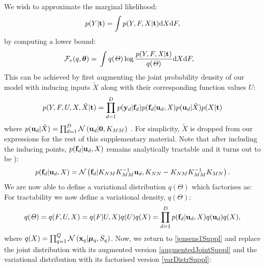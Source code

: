 \documentclass{article} %
\begin{document}
We wish to approximate the marginal likelihood:
\begin{equation}
\label{marginalLikelihoodSuppl}
p(Y | \mathbf{t}) =  \int p( Y , F, X| \mathbf{t}) \text{d}  X \text{d} F,
\end{equation}
by computing a lower bound:
\begin{align}
\mathcal{F}_v(q, \boldsymbol \theta) = {}& \int q(\mathit{\Theta}) \log 
		\frac{ p(Y , F , \mathit{X} | \mathbf{t})}
			 {q(\mathit{\Theta})}  \text{d}  X \text{d} F,
		 \label{jensens1Suppl}
\end{align}
%
This can be achieved by first augmenting the joint probability density of our model with inducing inputs $\tilde{X}$ along with their corresponding function values $U$:
\begin{equation}
 \label{augmentedJointSuppl}
p(Y,F, U,X,\tilde{X} | \mathbf{t}) = \prod_{d=1}^D p(\mathbf{y}_d | \mathbf{f}_d) p(\mathbf{f}_d | \mathbf{u}_d, \mathit{X})
p(\mathbf{u}_d | \tilde{X})  p(X | \mathbf{t})
\end{equation}
where $p(\mathbf{u}_d | \tilde{X}) = \prod_{d=1}^D \mathcal{N} \left( \mathbf{u}_d | \mathbf{0}, K_{MM} \right)$ . For simplicity, $\tilde{X}$ is dropped from our
expressions for the rest of this supplementary material. Note that after including the inducing points, $p(\mathbf{f}_d | \mathbf{u}_d, X)$
remains analytically tractable and it turns out to be \cite{rasmussen-williams}):
\begin{equation}
 \label{priorF2Suppl}
p(\mathbf{f}_d | \mathbf{u}_d, X) =  \mathcal{N}  \left( \mathbf{f}_d | K_{NM} K_{MM}^{-1} \mathbf{u}_d , K_{NN} - K_{NM} K_{MM}^{-1} K_{MN} \right).
\end{equation}
We are now able to define a variational distribution $q(\Theta)$ which factorises as:
For tractability we now define a variational density, $q(\Theta)$:
\begin{equation}
\label{varDistrSuppl}
q(\mathit{\Theta}) = q(F, U,X) = q(F | U, X) q(U) q(X) = \prod_{d=1}^D p(\mathbf{f}_d | \mathbf{u}_d, X )q(\mathbf{u}_d) q(X),
\end{equation}
%
%
where $q(X) = \prod_{q=1}^Q \mathcal{N} \left( \mathbf{x}_q | \boldsymbol \mu_q, S_q \right)$. 
%
Now, we return to \eqref{jensens1Suppl} and replace the joint distribution with its augmented version \eqref{augmentedJointSuppl} and the variational distribution with its factorised version \eqref{varDistrSuppl}:
\end{document}
